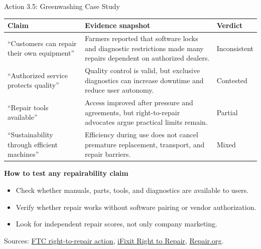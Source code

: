 \documentclass[aspectratio=169]{beamer}
\begin{document}
\begin{frame}{Action 3.5: Greenwashing Case Study}
\scriptsize
\begin{tabular}{p{2.5cm}p{5.6cm}p{2.2cm}}
\toprule
Claim & Evidence snapshot & Verdict \\
\midrule
``Customers can repair their own equipment'' & Farmers reported that software locks and diagnostic restrictions made many repairs dependent on authorized dealers. & Inconsistent \\
``Authorized service protects quality'' & Quality control is valid, but exclusive diagnostics can increase downtime and reduce user autonomy. & Contested \\
``Repair tools available'' & Access improved after pressure and agreements, but right-to-repair advocates argue practical limits remain. & Partial \\
``Sustainability through efficient machines'' & Efficiency during use does not cancel premature replacement, transport, and repair barriers. & Mixed \\
\bottomrule
\end{tabular}

\vspace{0.15cm}
\textbf{How to test any repairability claim}
\begin{itemize}
  \item Check whether manuals, parts, tools, and diagnostics are available to users.
  \item Verify whether repair works without software pairing or vendor authorization.
  \item Look for independent repair scores, not only company marketing.
\end{itemize}
\vspace{0.05cm}
\tiny Sources: \href{https://www.ftc.gov/news-events/news/press-releases/2021/07/ftc-adopt-new-policy-statement-enforcing-consumers-right-repair}{FTC right-to-repair action}, \href{https://www.ifixit.com/Right-to-Repair}{iFixit Right to Repair}, \href{https://www.repair.org}{Repair.org}.
\end{frame}
\end{document}
